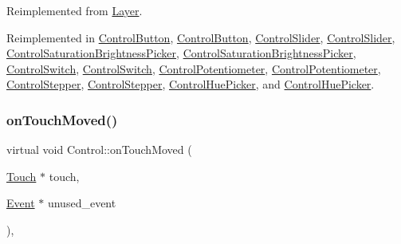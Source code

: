 Reimplemented from \hyperlink{classLayer_ad614a7a347f171cd6185e7aeef125047}{Layer}.



Reimplemented in \hyperlink{classControlButton_a8c8a5c24adf67ec671fbc113889f0870}{Control\+Button}, \hyperlink{classControlButton_aacecc916b91af98f4f9a2550d678bd44}{Control\+Button}, \hyperlink{classControlSlider_ad7aab266125d50d61a0a58c00f44f94d}{Control\+Slider}, \hyperlink{classControlSlider_adc06e1f4b54e0f72c9359c111b6913ff}{Control\+Slider}, \hyperlink{classControlSaturationBrightnessPicker_a1330b4d2fca4a1a312b1594e6ee6b99c}{Control\+Saturation\+Brightness\+Picker}, \hyperlink{classControlSaturationBrightnessPicker_aea0bada57d1f6e2bb3f456e77e342979}{Control\+Saturation\+Brightness\+Picker}, \hyperlink{classControlSwitch_a74c30d86ef910e4ee32a413153e74042}{Control\+Switch}, \hyperlink{classControlSwitch_a74e7f363deee0b399be486f668dad631}{Control\+Switch}, \hyperlink{classControlPotentiometer_a5da1557dea949b31c82c56ed7aef23eb}{Control\+Potentiometer}, \hyperlink{classControlPotentiometer_aedfddc1d724a15c31897a50eaf1b93e6}{Control\+Potentiometer}, \hyperlink{classControlStepper_ae79c66bc7b2a2f44fbfe2fa3a5782ee9}{Control\+Stepper}, \hyperlink{classControlStepper_a83a981cc66f6e1669b079b83842d6b79}{Control\+Stepper}, \hyperlink{classControlHuePicker_ae287e5f1cd8856c76475825549f098d8}{Control\+Hue\+Picker}, and \hyperlink{classControlHuePicker_a09874584a6a21355d830546ee3b0751d}{Control\+Hue\+Picker}.

\mbox{\label{classControl_a98c8b1c7d2a15318ca720b5a398fbb14}} 
\subsubsection{\texorpdfstring{on\+Touch\+Moved()}{onTouchMoved()}\hspace{0.1cm}{\footnotesize\ttfamily [2/2]}}
{\footnotesize\ttfamily virtual void Control\+::on\+Touch\+Moved (\begin{DoxyParamCaption}\item[{\hyperlink{classTouch}{Touch} $\ast$}]{touch,  }\item[{\hyperlink{classEvent}{Event} $\ast$}]{unused\+\_\+event }\end{DoxyParamCaption})\hspace{0.3cm}{\ttfamily [override]}, {\ttfamily [virtual]}}

